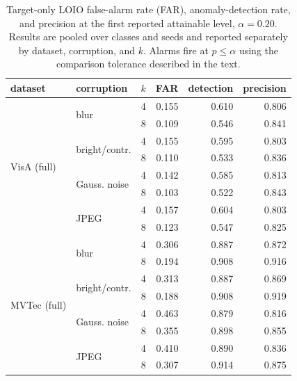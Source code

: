 \begin{table}[pos=t]
\centering
\caption{Target-only LOIO false-alarm rate (FAR), anomaly-detection rate, and precision at the first reported attainable level, $\alpha{=}0.20$. Results are pooled over classes and seeds and reported separately by dataset, corruption, and $k$. Alarms fire at $p\le\alpha$ using the comparison tolerance described in the text.}
\label{tab:false-alarm-control}
\footnotesize
\setlength{\tabcolsep}{3pt}
\begin{tabular}{llrrrr}
\toprule
dataset & corruption & $k$ & FAR & detection & precision \\
\midrule
\multirow{8}{*}{VisA (full)} & \multirow{2}{*}{blur} & 4 & 0.155 & 0.610 & 0.806 \\
 & & 8 & 0.109 & 0.546 & 0.841 \\
\cmidrule(lr){2-6}
 & \multirow{2}{*}{bright/contr.} & 4 & 0.155 & 0.595 & 0.803 \\
 & & 8 & 0.110 & 0.533 & 0.836 \\
\cmidrule(lr){2-6}
 & \multirow{2}{*}{Gauss. noise} & 4 & 0.142 & 0.585 & 0.813 \\
 & & 8 & 0.103 & 0.522 & 0.843 \\
\cmidrule(lr){2-6}
 & \multirow{2}{*}{JPEG} & 4 & 0.157 & 0.604 & 0.803 \\
 & & 8 & 0.123 & 0.547 & 0.825 \\
\midrule
\multirow{8}{*}{MVTec (full)} & \multirow{2}{*}{blur} & 4 & 0.306 & 0.887 & 0.872 \\
 & & 8 & 0.194 & 0.908 & 0.916 \\
\cmidrule(lr){2-6}
 & \multirow{2}{*}{bright/contr.} & 4 & 0.313 & 0.887 & 0.869 \\
 & & 8 & 0.188 & 0.908 & 0.919 \\
\cmidrule(lr){2-6}
 & \multirow{2}{*}{Gauss. noise} & 4 & 0.463 & 0.879 & 0.816 \\
 & & 8 & 0.355 & 0.898 & 0.855 \\
\cmidrule(lr){2-6}
 & \multirow{2}{*}{JPEG} & 4 & 0.410 & 0.890 & 0.836 \\
 & & 8 & 0.307 & 0.914 & 0.875 \\
\bottomrule
\end{tabular}
\end{table}
